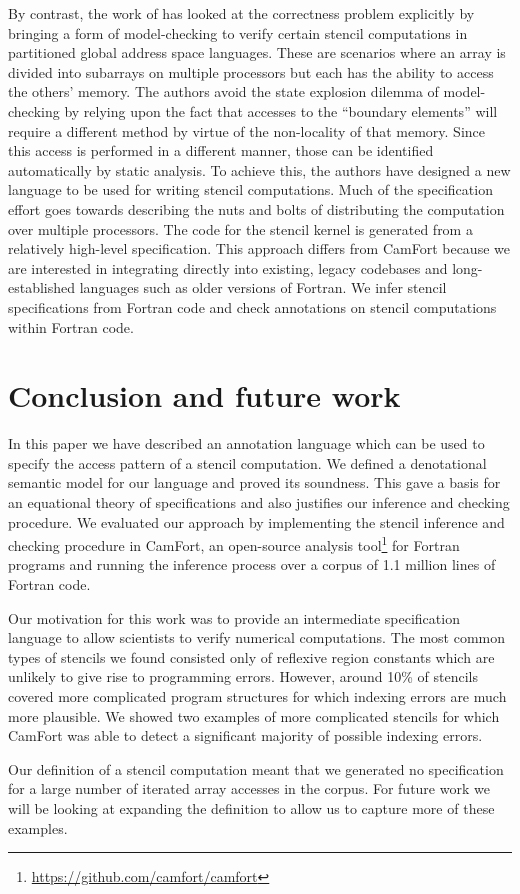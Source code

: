 \documentclass[9pt]{sigplanconf}
\theoremstyle{definition}
\begin{document}
By contrast, the work of \citet{Abe:2013:IPDPSW} has looked at the
correctness problem explicitly by bringing a form of model-checking to
verify certain stencil computations in partitioned global address
space languages. These are scenarios where an array is divided into
subarrays on multiple processors but each has the ability to access
the others' memory. The authors avoid the state explosion dilemma of
model-checking by relying upon the fact that accesses to the
``boundary elements'' will require a different method by virtue of the
non-locality of that memory. Since this access is performed in a
different manner, those can be identified automatically by static
analysis. To achieve this, the authors have designed a new language to
be used for writing stencil computations. Much of the specification
effort goes towards describing the nuts and bolts of distributing the
computation over multiple processors. The code for the stencil kernel
is generated from a relatively high-level specification. This approach
differs from CamFort because we are interested in integrating directly
into existing, legacy codebases and long-established languages such as
older versions of Fortran. We infer stencil specifications from
Fortran code and check annotations on stencil computations within
Fortran code.

\section{Conclusion and future work}

In this paper we have described an annotation language which can be
used to specify the access pattern of a stencil computation. We
defined a denotational semantic model for our language and proved its
soundness. This gave a basis for an equational theory of
specifications and also justifies our inference and checking
procedure. We evaluated our approach by implementing the stencil inference and
checking procedure in CamFort, an open-source analysis tool\footnote{\url{https://github.com/camfort/camfort}} for
Fortran programs and running the inference process over a corpus of
1.1 million lines of Fortran code.

Our motivation for this work was to provide an intermediate
specification language to allow scientists to verify numerical
computations. The most common types of stencils we found consisted only of
reflexive region constants which are unlikely to give rise to
programming errors. However, around 10\% of stencils covered more
complicated program structures for which indexing errors are much more
plausible. We showed two examples of more complicated stencils for
which CamFort was able to detect a significant majority of possible
indexing errors.

Our definition of a stencil computation meant that we generated no
specification for a large number of iterated array accesses in the corpus. For
future work we will be looking at expanding the definition to allow us
to capture more of these examples.


\end{document}
